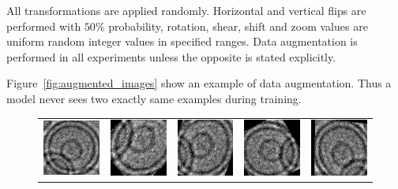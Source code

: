 \documentclass[a4paper, 11pt, table]{article}
\begin{document}
All transformations are applied randomly. Horizontal and vertical flips are performed with $50\%$ probability, rotation, shear, shift and zoom values are uniform random integer values in specified ranges. Data augmentation is performed in all experiments unless the opposite is stated explicitly.

Figure~\ref{fig:augmented_images} show an example of data augmentation. Thus a model never sees two exactly same examples during training.

\begin{figure}[H]
\centering
\begin{tabular}{ccccc}
\includegraphics[scale=0.5]{augmented/541253.jpg} & \includegraphics[scale=0.5]{augmented/_0_645.jpeg} & \includegraphics[scale=0.5]{augmented/_0_1385.jpeg} & \includegraphics[scale=0.5]{augmented/_0_1749.jpeg} & \includegraphics[scale=0.5]{augmented/_0_2343.jpeg} \\


\end{tabular}
\end{figure}
\end{document}
